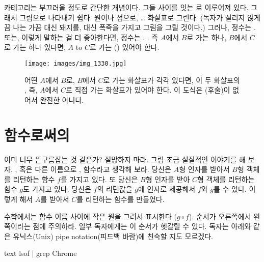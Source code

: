 

\lettrine[lhang=0.17]{카}{테고리}는 부끄러울 정도로 간단한 개념이다.
 \newterm{\trObject}\와 그들 사이를 잇는 \newterm{\trArrow}로 이루어져 있다. 
그래서 \trCategory\는 그림으로 나타내기 쉽다.  원이나 점으로, 
\trArrow\는\ldots{} 화살표로 그린다. (독자가 질리지 않게끔 
나는 가끔 \trObject 대신 돼지를, \trArrow 대신 폭죽을 가지고 그림을 그릴 것이다.)
그러나,  정수는 . 또는, 이렇게 말하는 걸 더 좋아한다면,  정수는 .
\trArrow\는 . 
즉 \trObject $A$에서 \trObject $B$로 가는  하나, \trObject $B$에서 \trObject $C$로 가는  하나 있다면, 
$A$ to $C$로 가는 () 있어야 한다.

\begin{figure}
\centering
\texttt{[image: images/img\_1330.jpg]}
\caption{어떤  $A$에서 $B$로, $B$에서 $C$로 가는 화살표가 각각 있다면,
이 두 화살표의 \trComposition, 즉, $A$에서 $C$로 직접 가는 화살표가 있어야 한다.
이 도식은 \trIdentityMorphism(후술)이 없어서 완전한  아니다.}
\end{figure}

\section{함수로써의 \trArrow}

이미 너무 뜬구름잡는 것 같은가? 절망하지 마라. 그럼 조금 실질적인 이야기를 해 보자.
\trArrow\를, 혹은 다른 이름으로 \newterm{\trMorphism}\을, 함수라고 생각해 보라.
당신은 $A$형 인자를 받아서 $B$형 객체를 리턴하는 함수 $f$를 가지고 있다.
또 당신은 $B$형 인자를 받아 $C$형 객체를 리턴하는 함수 $g$도 가지고 있다.
당신은 $f$의 리턴값을 $g$에 인자로 제공해서 $f$와 $g$를  수 있다.
이렇게 해서 $A$를 받아서 $C$를 리턴하는 함수를 만들었다.

수학에서는 함수 이름 사이에 작은 원을 그려서  표시한다 ($g \circ f$). 
\trComposition 순서가 오른쪽에서 왼쪽이라는 점에 주의하라. 일부 독자에게는 이 순서가 헷갈릴 수 있다.
독자는 아래와 같은 유닉스(Unix) pipe notation(피드백 바람)에 친숙할 지도 모르겠다.

\begin{snip}{text}
lsof | grep Chrome
\end{snip}

